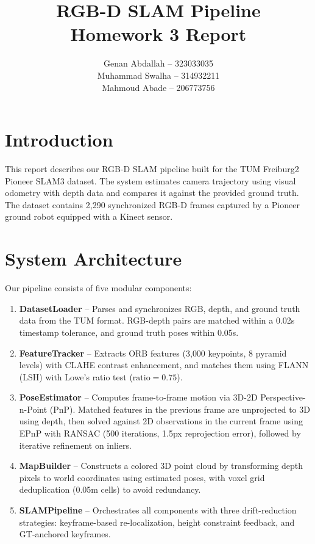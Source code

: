 \documentclass[12pt,a4paper]{article}
\title{\textbf{RGB-D SLAM Pipeline} \\ \large Homework 3 Report}
\author{
    Genan Abdallah -- 323033035 \\
    Muhammad Swalha -- 314932211 \\
    Mahmoud Abade -- 206773756
}
\date{}
\begin{document}
\maketitle

\section{Introduction}

This report describes our RGB-D SLAM pipeline built for the TUM Freiburg2 Pioneer SLAM3 dataset.
The system estimates camera trajectory using visual odometry with depth data and compares it against the provided ground truth.
The dataset contains 2{,}290 synchronized RGB-D frames captured by a Pioneer ground robot equipped with a Kinect sensor.

\section{System Architecture}

Our pipeline consists of five modular components:

\begin{enumerate}
    \item \textbf{DatasetLoader} -- Parses and synchronizes RGB, depth, and ground truth data from the TUM format. RGB-depth pairs are matched within a 0.02s timestamp tolerance, and ground truth poses within 0.05s.

    \item \textbf{FeatureTracker} -- Extracts ORB features (3{,}000 keypoints, 8 pyramid levels) with CLAHE contrast enhancement, and matches them using FLANN (LSH) with Lowe's ratio test ($\text{ratio} = 0.75$).

    \item \textbf{PoseEstimator} -- Computes frame-to-frame motion via 3D-2D Perspective-n-Point (PnP). Matched features in the previous frame are unprojected to 3D using depth, then solved against 2D observations in the current frame using EPnP with RANSAC (500 iterations, 1.5px reprojection error), followed by iterative refinement on inliers.

    \item \textbf{MapBuilder} -- Constructs a colored 3D point cloud by transforming depth pixels to world coordinates using estimated poses, with voxel grid deduplication (0.05m cells) to avoid redundancy.

    \item \textbf{SLAMPipeline} -- Orchestrates all components with three drift-reduction strategies: keyframe-based re-localization, height constraint feedback, and GT-anchored keyframes.
\end{enumerate}
\end{document}
